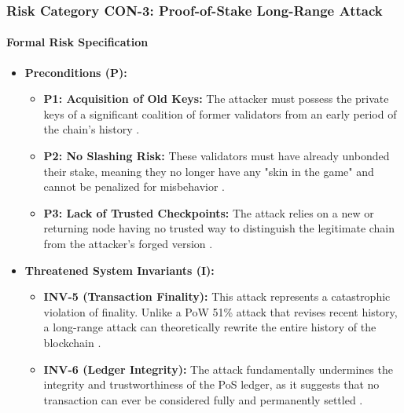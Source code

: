 \subsubsection{Risk Category CON-3: Proof-of-Stake Long-Range Attack}

\paragraph{Formal Risk Specification}

\begin{itemize}
    \item \textbf{Preconditions (P):}
    \begin{itemize}
        \item \textbf{P1: Acquisition of Old Keys:} The attacker must possess the private keys of a significant coalition of former validators from an early period of the chain's history \cite{Wang2019}.
        \item \textbf{P2: No Slashing Risk:} These validators must have already unbonded their stake, meaning they no longer have any "skin in the game" and cannot be penalized for misbehavior \cite{Wang2019}.
        \item \textbf{P3: Lack of Trusted Checkpoints:} The attack relies on a new or returning node having no trusted way to distinguish the legitimate chain from the attacker's forged version \cite{Wang2019}.
    \end{itemize}

    \item \textbf{Threatened System Invariants (I):}
    \begin{itemize}
        \item \textbf{INV-5 (Transaction Finality):} This attack represents a catastrophic violation of finality. Unlike a PoW 51\% attack that revises recent history, a long-range attack can theoretically rewrite the entire history of the blockchain \cite{Wang2019}.
        \item \textbf{INV-6 (Ledger Integrity):} The attack fundamentally undermines the integrity and trustworthiness of the PoS ledger, as it suggests that no transaction can ever be considered fully and permanently settled \cite{Wang2019}.
    \end{itemize}


\end{itemize}
